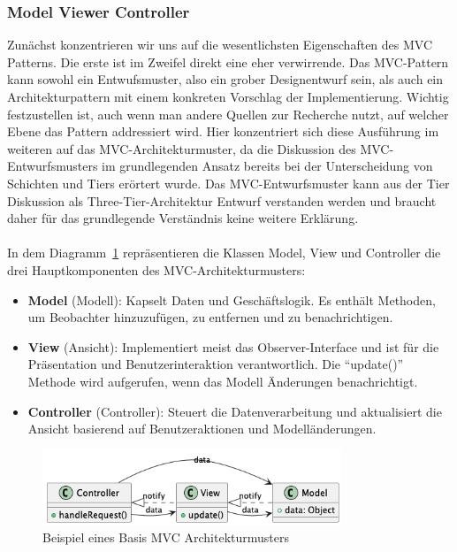 \subsubsection{Model Viewer Controller}
Zunächst konzentrieren wir uns auf die wesentlichsten Eigenschaften des MVC Patterns. Die erste ist im Zweifel direkt eine eher verwirrende. Das MVC-Pattern kann sowohl ein Entwufsmuster, also ein grober Designentwurf sein, als auch ein Architekturpattern mit einem konkreten Vorschlag der Implementierung. Wichtig festzustellen ist, auch wenn man andere Quellen zur Recherche nutzt, auf welcher Ebene das Pattern addressiert wird.  Hier konzentriert sich diese Ausführung im weiteren auf das MVC-Architekturmuster, da die Diskussion des MVC-Entwurfsmusters im grundlegenden Ansatz bereits bei der Unterscheidung von Schichten und Tiers erörtert wurde. Das MVC-Entwurfsmuster kann aus der Tier Diskussion als Three-Tier-Architektur Entwurf verstanden werden und braucht daher für das grundlegende Verständnis keine weitere Erklärung.
\\\\
In dem Diagramm~\ref{fig:default-mvc} repräsentieren die Klassen Model, View und Controller die drei Hauptkomponenten des MVC-Architekturmusters:
\begin{itemize}
\item \textbf{Model} (Modell): Kapselt Daten und Geschäftslogik. Es enthält Methoden, um Beobachter hinzuzufügen, zu entfernen und zu benachrichtigen.
\item \textbf{View} (Ansicht): Implementiert meist das Observer-Interface und ist für die Präsentation und Benutzerinteraktion verantwortlich. Die \enquote{update()} Methode wird aufgerufen, wenn das Modell Änderungen benachrichtigt.
\item \textbf{Controller} (Controller): Steuert die Datenverarbeitung und aktualisiert die Ansicht basierend auf Benutzeraktionen und Modelländerungen.
\end{itemize}

\begin{figure}[ht]
  \centering
  \includegraphics[width=0.8\textwidth]{fig/uml/default-mvc.png}
  \caption{Beispiel eines Basis MVC Architekturmusters}
  \label{fig:default-mvc}
\end{figure}


